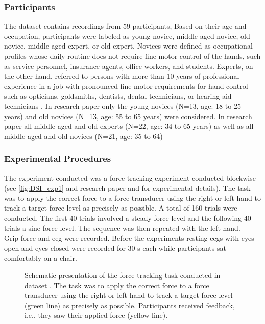 \subsubsection{Participants}
\label{methods:datasets:I:participants}
The dataset contains recordings from 59 participants, Based on their age and occupation, participants were labeled as young novice, middle-aged novice, old novice, middle-aged expert, or old expert. Novices were defined as occupational profiles whose daily routine does not require fine motor control of the hands, such as service personnel, insurance agents, office workers, and students. Experts, on the other hand, referred to persons with more than 10 years of professional experience in a job with pronounced fine motor requirements for hand control such as opticians, goldsmiths, dentists, dental technicians, or hearing aid technicians \cite{Ericsson1991}. In research paper  only the young novices (N=13, age: 18 to 25 years) and old novices (N=13, age: 55 to 65 years) were considered. In research paper  all middle-aged and old experts (N=22, age: 34 to 65 years) as well as all middle-aged and old novices (N=21, age: 35 to  64)

\subsubsection{Experimental Procedures}
\label{methods:datasets:I:experiment}
The experiment conducted was a force-tracking experiment conducted blockwise (see \autoref{fig:DSI_exp1} and research paper  and  for experimental details). The task was to apply the correct force to a force transducer using the right or left hand to track a target force level as precisely as possible. A total of 160 trials were conducted. The first 40 trials involved a steady force level and the following 40 trials a sine force level. The sequence was then repeated with the left hand.\\
Grip force and \gls{eeg} were recorded. Before the experiments resting \glspl{eeg} with eyes open and eyes closed were recorded for 30 s each while participants sat comfortably on a chair.

\begin{figure}[h]
\begin{center}

\caption[Schematic presentation of the force-tracking task conducted in dataset .]{Schematic presentation of the force-tracking task conducted in dataset . The task was to apply the correct force to a force transducer using the right or left hand to track a target force level (green line) as precisely as possible. Participants received feedback, i.e., they saw their applied force (yellow line).}
\label{fig:DSI_exp1}
\end{center}
\end{figure}

